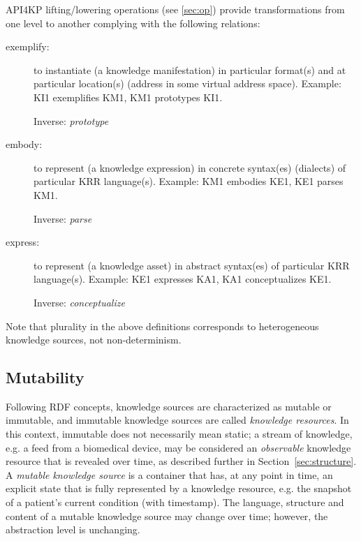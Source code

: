 \documentclass[runningheads]{llncs}
\begin{document}
API4KP lifting/lowering operations (see \ref{sec:op}) provide transformations from one level to another complying with the following relations:
\begin{description}
\item[exemplify:] to instantiate (a knowledge manifestation) in particular format(s) and at particular location(s) (address in some virtual address space). Example: KI1 exemplifies KM1, KM1 prototypes KI1.

Inverse: \emph{prototype}
\item[embody:] to represent (a knowledge expression) in concrete syntax(es) (dialects) of particular KRR language(s). Example: KM1 embodies KE1, KE1 parses KM1.

Inverse: \emph{parse}
\item[express:] to represent (a knowledge asset) in abstract syntax(es) of particular KRR language(s). Example: KE1 expresses KA1, KA1 conceptualizes KE1.

Inverse: \emph{conceptualize}
\end{description}
Note that plurality in the above definitions corresponds to heterogeneous knowledge sources, not non-determinism.

\subsection{Mutability}
Following RDF concepts\cite{RDF2014}, knowledge sources are characterized as mutable or immutable, and immutable knowledge sources are called \emph{knowledge resources}. In this context, immutable does not necessarily mean static;  a stream of knowledge, e.g. a feed from a biomedical device, may be considered an \emph{observable} knowledge resource that is revealed over time, as described further in Section~\ref{sec:structure}.
A \emph{mutable knowledge source} is a container that has, at any point in time, an explicit state that is fully represented by a knowledge resource, e.g. the snapshot of a patient's current condition (with timestamp). The language, structure and content of a mutable knowledge source may change over time; however, the abstraction level is unchanging. 
\end{document}
